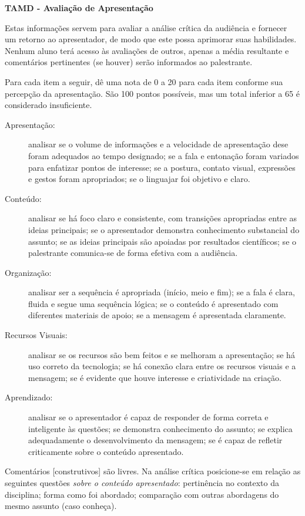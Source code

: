 \documentclass{UnBExam}%
\begin{document}
    \begin{center}%
    	\textbf{TAMD - Avaliação de Apresentação}%
    \end{center}%

    Estas informações servem para avaliar a análise crítica da audiência e fornecer
    um retorno ao apresentador, de modo que este possa aprimorar suas habilidades.
    Nenhum aluno terá acesso às avaliações de outros, apenas a média resultante e
    comentários pertinentes (se houver) serão informados ao palestrante.%

    Para cada item a seguir, dê uma nota de 0 a 20 para cada item conforme sua
    percepção da apresentação. São 100 pontos possíveis, mas um total inferior a
    65 é considerado insuficiente.%

	\begin{description}%
		\item[Apresentação:] analisar se o volume de informações e a velocidade
		de apresentação dese foram adequados ao tempo designado; se a fala e
		entonação foram variados para enfatizar pontos de interesse; se a postura,
		contato visual, expressões e gestos foram apropriados; se o linguajar foi
		objetivo e claro.
		\item[Conteúdo:] analisar se há foco claro e consistente, com transições
		apropriadas entre as ideias principais; se o apresentador demonstra
		conhecimento substancial do assunto; se as ideias principais são apoiadas
		por resultados científicos; se o palestrante comunica-se de forma efetiva
		com a audiência.
		\item[Organização:] analisar ser a sequência é apropriada (início, meio
		e fim); se a fala é clara, fluida e segue uma sequência lógica; se o
		conteúdo é apresentado com diferentes materiais de apoio; se a mensagem
		é apresentada claramente.
		\item[Recursos Visuais:] analisar se os recursos são bem feitos e se
		melhoram a apresentação; se há uso correto da tecnologia; se há conexão
		clara entre os recursos visuais e a mensagem; se é evidente que houve
		interesse e criatividade na criação.
		\item[Aprendizado:] analisar se o apresentador é capaz de responder de
		forma correta e inteligente às questões; se demonstra conhecimento do
		assunto; se explica adequadamente o desenvolvimento da mensagem; se
		é capaz de refletir criticamente sobre o conteúdo apresentado.
	\end{description}%
	Comentários [construtivos] são livres. Na análise crítica posicione-se em
	relação as seguintes questões \emph{sobre o conteúdo apresentado}:
	pertinência no contexto da disciplina; forma como foi abordado; comparação
	com outras abordagens do mesmo assunto (caso conheça).
\end{document}

